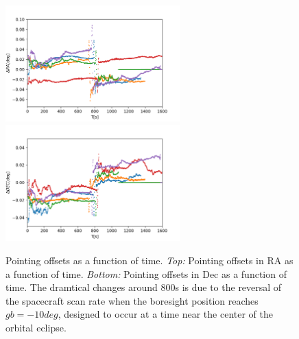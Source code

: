 \documentclass[12pt, preprint]{aastex}
\begin{document}
\begin{figure}[p]
\begin{center}
\includegraphics[width=0.6\textwidth]{figures/all-ra}
\includegraphics[width=0.6\textwidth]{figures/all-dec}
\end{center}
\caption{%
  \label{pointing}
  Pointing offsets as a function of time.
  \emph{Top:}  Pointing offsets in RA as a function of time.
  \emph{Bottom:} Pointing offsets in Dec as a function of time.
  The dramtical changes around 800s is due to the reversal of the spacecraft scan rate when the boresight position reaches $gb=-10 deg$, designed to occur at a time near the center of the orbital eclipse.
  }
\end{figure}
\end{document}
